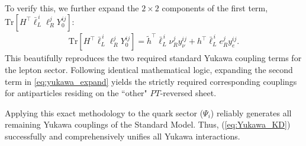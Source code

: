 To verify this, we further expand the $2\times 2$ components of the first term, $\text{Tr}[H^{\top}\bar{\ell}_{L}^{\,i}\ell_{R}^jY_0^{ij}]$: 
\begin{equation}
\begin{aligned}
    \text{Tr}[H^\top\bar{\ell}_{L}^{\,i}\ell_{R}^jY_0^{ij}]
    =\tilde{h}^\top\bar{\ell}_{L}^{\,i} \nu_R^j y_\nu^{ij}+h^\top \bar{\ell}_{L}^{\,i}e_R^j y_e^{ij}.
\end{aligned}
\end{equation}
This beautifully reproduces the two required standard Yukawa coupling terms for the lepton sector. Following identical mathematical logic, expanding the second term in \cref{eq:yukawa_expand} yields the strictly required corresponding couplings for antiparticles residing on the ``other" $PT$-reversed sheet. 

Applying this exact methodology to the quark sector ($\Psi_i$) reliably generates all remaining Yukawa couplings of the Standard Model. Thus, (\ref{eq:Yukawa_KD}) successfully and comprehensively unifies all Yukawa interactions.


